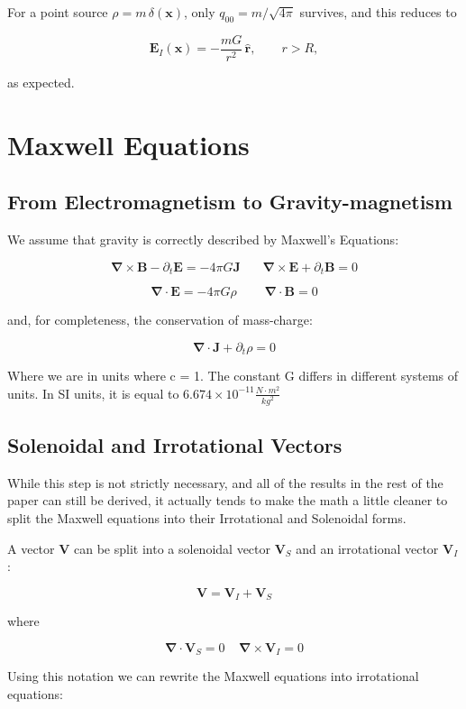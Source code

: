 \documentclass {article}
\renewcommand\vec{\mathbf}
\let\OldS\nabla
\renewcommand{\nabla}{\boldsymbol{\OldS}}
\let\OldHat\hat
\renewcommand{\hat}[1]{\OldHat{\mathbf{#1}}}
\begin{document}
For a point source $\rho = m\,\delta(\vec x)$, only $q_{00} = m/\sqrt{4\pi}$ survives, and this reduces to

$$\vec{E}_I(\vec x) = -\frac{mG}{r^2}\,\hat r, \qquad r > R,$$

as expected.

\newpage


\section{Maxwell Equations}
\subsection{From Electromagnetism to Gravity-magnetism}



We assume that gravity is correctly described by Maxwell's Equations:

$$\nabla \times \vec B  - \partial_t \vec E  = -4 \pi G \vec J ~~~~~~~~ \nabla \times \vec E + \partial_t \vec B = 0    $$

$$\nabla \cdot \vec E = -4 \pi G \rho ~~~~~~~~~~ \nabla \cdot \vec B = 0   $$

and, for completeness, the conservation of mass-charge:

$$\nabla \cdot \vec J + \partial_t \rho = 0 $$

Where we are in units where c = 1. The constant G differs in different systems of units. In SI units, it is equal to $6.674 \times 10^{-11} \frac {N \cdot m^2}{kg^2}$ 

\newpage 
\subsection{Solenoidal and Irrotational Vectors}
While this step is not strictly necessary, and all of the results in the rest of the paper can still be derived, it actually tends to make the math a little cleaner to split the Maxwell equations into their Irrotational and Solenoidal forms.

A vector $\vec V$ can be split into a solenoidal vector $\vec V_S$ and an irrotational vector $\vec V_I$:

$$\vec V = \vec V_I + \vec V_S $$

where

$$\nabla \cdot \vec V_S = 0 ~~~~~ \nabla \times \vec V_I = 0 $$

Using this notation we can rewrite the Maxwell equations into irrotational equations:
\end{document}
